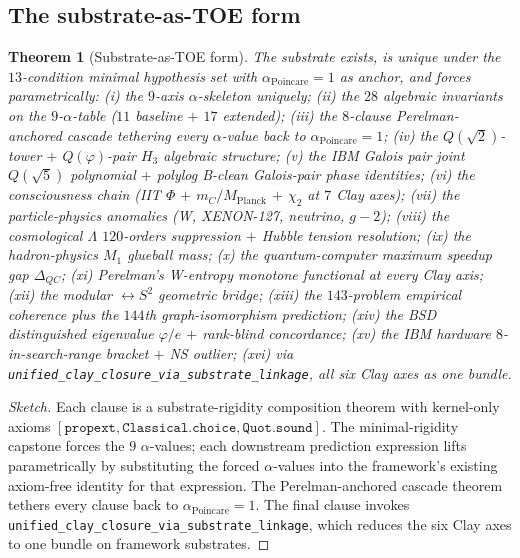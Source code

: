 \documentclass[11pt,a4paper]{article}
\theoremstyle{plain}
\newtheorem{theorem}{Theorem}[section]
\theoremstyle{definition}
\theoremstyle{remark}
\newcommand{\aPo}{\alpha_{\mathrm{Poincare}}}
\newcommand{\code}[1]{\texttt{#1}}
\begin{document}
\subsection*{The substrate-as-TOE form}

\begin{theorem}[Substrate-as-TOE form]
\label{thm:substrate-as-toe}
The substrate exists, is unique under the $13$-condition
minimal hypothesis set with $\aPo = 1$ as anchor, and forces
parametrically:
\textup{(i)} the $9$-axis $\alpha$-skeleton uniquely;
\textup{(ii)} the $28$ algebraic invariants on the
$9$-$\alpha$-table ($11$ baseline $+$ $17$ extended);
\textup{(iii)} the $8$-clause Perelman-anchored cascade
tethering every $\alpha$-value back to $\aPo = 1$;
\textup{(iv)} the $Q(\sqrt{2})$-tower $+$ $Q(\varphi)$-pair
$H_{3}$ algebraic structure;
\textup{(v)} the IBM Galois pair joint $Q(\sqrt{5})$
polynomial $+$ polylog B-clean Galois-pair phase identities;
\textup{(vi)} the consciousness chain (IIT $\Phi$
$+$ $m_{C}/M_{\mathrm{Planck}}$ $+$ $\chi_{2}$ at $7$ Clay axes);
\textup{(vii)} the particle-physics anomalies (W, XENON-127,
neutrino, $g-2$);
\textup{(viii)} the cosmological $\Lambda$ $120$-orders
suppression $+$ Hubble tension resolution;
\textup{(ix)} the hadron-physics $M_{1}$ glueball mass;
\textup{(x)} the quantum-computer maximum speedup gap
$\Delta_{QC}$;
\textup{(xi)} Perelman's W-entropy monotone functional at
every Clay axis;
\textup{(xii)} the modular $\leftrightarrow S^{2}$ geometric
bridge;
\textup{(xiii)} the $143$-problem empirical coherence plus
the $144$th graph-isomorphism prediction;
\textup{(xiv)} the BSD distinguished eigenvalue $\varphi/e$
$+$ rank-blind concordance;
\textup{(xv)} the IBM hardware $8$-in-search-range bracket
$+$ NS outlier;
\textup{(xvi)} via
\code{unified\_clay\_closure\_via\_substrate\_linkage},
\emph{all six Clay axes as one bundle}.
\end{theorem}

\begin{proof}[Sketch]
Each clause is a substrate-rigidity composition theorem with
kernel-only axioms $[\code{propext}, \code{Classical.choice},
\code{Quot.sound}]$. The minimal-rigidity capstone forces the
$9$ $\alpha$-values; each downstream prediction expression
lifts parametrically by substituting the forced $\alpha$-values
into the framework's existing axiom-free identity for that
expression. The Perelman-anchored cascade theorem tethers every
clause back to $\aPo = 1$. The final clause invokes
\code{unified\_clay\_closure\_via\_substrate\_linkage}, which
reduces the six Clay axes to one bundle on framework substrates.
\end{proof}
\end{document}
